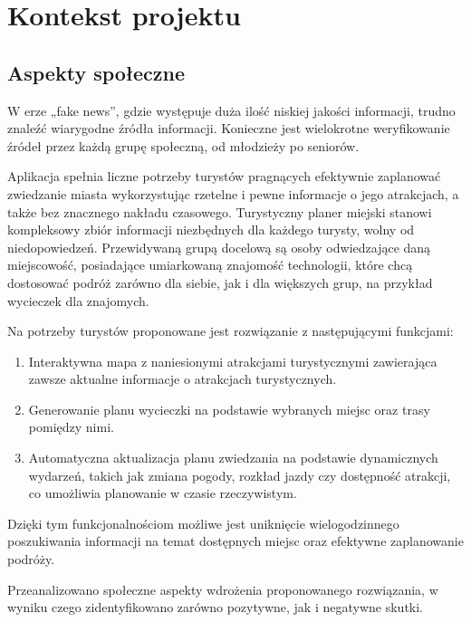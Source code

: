 
\chapter{Kontekst projektu}
\label{ch:kontekst-projektu}

\section{Aspekty społeczne}
\label{sec:aspekty-spoleczne}

W erze „fake news”, gdzie występuje duża ilość niskiej jakości informacji, trudno znaleźć wiarygodne źródła informacji.
Konieczne jest wielokrotne weryfikowanie źródeł przez każdą grupę społeczną, od młodzieży po seniorów.

\indent Aplikacja spełnia liczne potrzeby turystów pragnących efektywnie zaplanować zwiedzanie miasta wykorzystując rzetelne i pewne informacje o jego atrakcjach, a także bez znacznego nakładu czasowego.
Turystyczny planer miejski stanowi kompleksowy zbiór informacji niezbędnych dla każdego turysty, wolny od niedopowiedzeń.
Przewidywaną grupą docelową są osoby odwiedzające daną miejscowość, posiadające umiarkowaną znajomość technologii, które chcą dostosować podróż zarówno dla siebie, jak i dla większych grup, na przykład wycieczek dla znajomych.

\indent Na potrzeby turystów proponowane jest rozwiązanie z następującymi funkcjami:

\begin{enumerate}
    \item Interaktywna mapa z naniesionymi atrakcjami turystycznymi zawierająca zawsze aktualne informacje o atrakcjach turystycznych.
    \item Generowanie planu wycieczki na podstawie wybranych miejsc oraz trasy pomiędzy nimi.
    \item Automatyczna aktualizacja planu zwiedzania na podstawie dynamicznych wydarzeń, takich jak zmiana pogody, rozkład jazdy czy dostępność atrakcji, co umożliwia planowanie w czasie rzeczywistym.
\end{enumerate}

Dzięki tym funkcjonalnościom możliwe jest uniknięcie wielogodzinnego poszukiwania informacji na temat dostępnych miejsc oraz efektywne zaplanowanie podróży.

\indent Przeanalizowano społeczne aspekty wdrożenia proponowanego rozwiązania, w wyniku czego zidentyfikowano zarówno pozytywne, jak i negatywne skutki.

